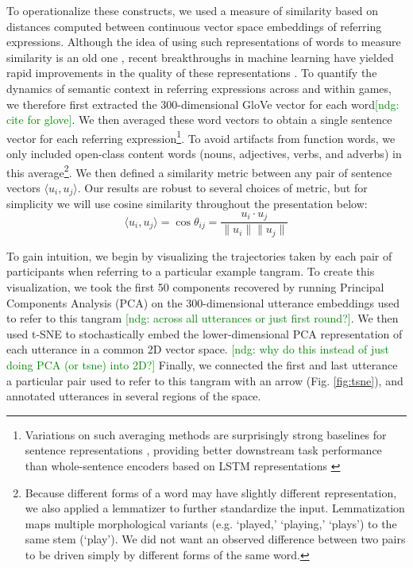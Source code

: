 \documentclass[alpha-refs]{wiley-article}
\newcommand{\ndg}[1]{\textcolor{green}{[ndg: #1]}}
\begin{document}
To operationalize these constructs, we used a measure of similarity based on distances computed between continuous vector space embeddings of referring expressions.
Although the idea of using such representations of words to measure similarity is an old one \citep{osgood1952nature,landauer_solution_1997,bengio_neural_2003}, recent breakthroughs in machine learning have yielded rapid improvements in the quality of these representations \citep[e.g.][]{mikolov2013distributed,pennington2014glove}.
To quantify the dynamics of semantic context in referring expressions across and within games, we therefore first extracted the 300-dimensional GloVe vector for each word\ndg{cite for glove}. 
We then averaged these word vectors to obtain a single sentence vector for each referring expression\footnote{Variations on such averaging methods are surprisingly strong baselines for sentence representations \citep{arora2017asimple}, providing better downstream task performance than whole-sentence encoders based on LSTM representations \citep{KirosEtAl15_SkipThought}}.
To avoid artifacts from function words, we only included open-class content words (nouns, adjectives, verbs, and adverbs) in this average\footnote{Because different forms of a word may have slightly different representation, we also applied a lemmatizer to further standardize the input. Lemmatization maps multiple morphological variants (e.g. `played,' `playing,' `plays') to the same stem (`play'). We did not want an observed difference between two pairs to be driven simply by different forms of the same word.}.
We then defined a similarity metric between any pair of sentence vectors $\langle u_i, u_j \rangle$.
Our results are robust to several choices of metric, but for simplicity we will use cosine similarity throughout the presentation below: $$\langle u_i, u_j \rangle = \cos \theta_{ij} = \frac{u_i \cdot u_j}{\| u_i\| \| u_j \|}$$

To gain intuition, we begin by visualizing the trajectories taken by each pair of participants when referring to a particular example tangram.
To create this visualization, we took the first 50 components recovered by running Principal Components Analysis (PCA) on the 300-dimensional utterance embeddings used to refer to this tangram \ndg{across all utterances or just first round?}. 
We then used t-SNE \citep{maaten2008visualizing} to stochastically embed the lower-dimensional PCA representation of each utterance in a common 2D vector space. 
\ndg{why do this instead of just doing PCA (or tsne) into 2D?}
Finally, we connected the first and last utterance a particular pair used to refer to this tangram with an arrow (Fig. \ref{fig:tsne}), and annotated utterances in several regions of the space.
\end{document}

